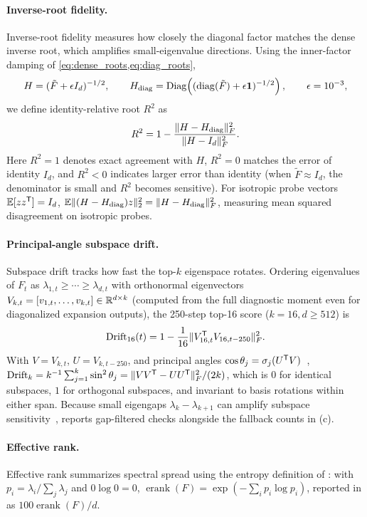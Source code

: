 \paragraph{Inverse-root fidelity.}
Inverse-root fidelity measures how closely the diagonal factor matches the dense inverse root, which amplifies small-eigenvalue directions. Using the inner-factor damping of \cref{eq:dense_roots,eq:diag_roots},
\[
 H=(\tilde F+\epsilon I_d)^{-1/2},\qquad
 H_{\rm diag}=\operatorname{Diag}\!\left((\operatorname{diag}(\tilde F)+\epsilon\mathbf1)^{-1/2}\right),
 \qquad\epsilon=10^{-3},
\]
we define identity-relative root $R^2$ as
\begin{equation}
 R^2=1-\frac{\|H-H_{\rm diag}\|_F^2}{\|H-I_d\|_F^2}.
 \label{eq:r2_root}
\end{equation}
Here $R^2=1$ denotes exact agreement with $H$, $R^2=0$ matches the error of identity $I_d$, and $R^2<0$ indicates larger error than identity (when $\tilde F\approx I_d$, the denominator is small and $R^2$ becomes sensitive). For isotropic probe vectors $\mathbb{E}[zz^{{\mathsf{T}}}]=I_d$, $\mathbb{E}\|(H-H_{\rm diag})z\|_2^2=\|H-H_{\rm diag}\|_F^2$, measuring mean squared disagreement on isotropic probes.

\paragraph{Principal-angle subspace drift.}
Subspace drift tracks how fast the top-$k$ eigenspace rotates. Ordering eigenvalues of $F_t$ as $\lambda_{1,t}\ge\cdots\ge\lambda_{d,t}$ with orthonormal eigenvectors $V_{k,t}=[v_{1,t},\ldots,v_{k,t}]\in\mathbb{R}^{d\times k}$ (computed from the full diagnostic moment even for diagonalized expansion outputs), the 250-step top-16 score ($k=16,d\ge512$) is
\begin{equation}
 \mathrm{Drift}_{16}(t)=1-\frac1{16}\|V_{16,t}^{{\mathsf{T}}}V_{16,t-250}\|_F^2.
 \label{eq:subspace_drift}
\end{equation}
With $V=V_{k,t}$, $U=V_{k,t-250}$, and principal angles $\cos\theta_j=\sigma_j(U^{{\mathsf{T}}}V)$~\citep{bjorck1973angles,yu2015davis}, $\mathrm{Drift}_k=k^{-1}\sum_{j=1}^k\sin^2\theta_j=\|VV^{{\mathsf{T}}}-UU^{{\mathsf{T}}}\|_F^2/(2k)$, which is $0$ for identical subspaces, $1$ for orthogonal subspaces, and invariant to basis rotations within either span. Because small eigengaps $\lambda_k-\lambda_{k+1}$ can amplify subspace sensitivity~\citep{yu2015davis},  reports gap-filtered checks alongside the fallback counts in (c).

\paragraph{Effective rank.}
Effective rank summarizes spectral spread using the entropy definition of \citet{roy2007effective}: with $p_i=\lambda_i/\sum_j\lambda_j$ and $0\log0=0$, $\operatorname{erank}(F)=\exp(-\sum_i p_i\log p_i)$, reported in  as $100\operatorname{erank}(F)/d$.

